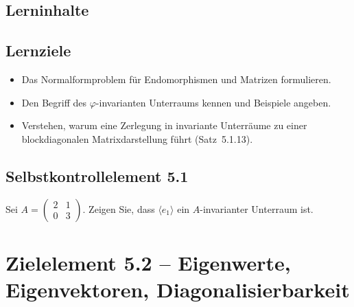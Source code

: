 \documentclass[a4paper,12pt]{article}
\begin{document}
\subsection*{Lerninhalte}
\begin{center}
\end{center}

\subsection*{Lernziele}
\begin{itemize}
  \item Das Normalformproblem für Endomorphismen und Matrizen formulieren.
  \item Den Begriff des $\varphi$-invarianten Unterraums kennen und Beispiele angeben.
  \item Verstehen, warum eine Zerlegung in invariante Unterräume zu einer blockdiagonalen Matrixdarstellung führt (Satz~5.1.13).
\end{itemize}

\subsection*{Selbstkontrollelement 5.1}
Sei $A = \begin{pmatrix}2&1\\0&3\end{pmatrix}$. Zeigen Sie, dass $\langle e_1 \rangle$ ein $A$-invarianter Unterraum ist.

\newpage

\section*{Zielelement 5.2 -- Eigenwerte, Eigenvektoren, Diagonalisierbarkeit}
\end{document}
